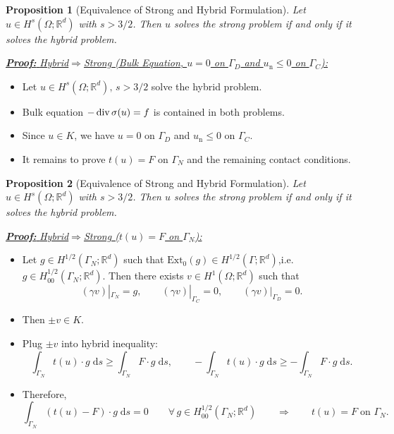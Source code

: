 \documentclass[10pt,aspectratio=169]{beamer}
\newtheorem{proposition}{Proposition}[section]
\def\R{{\mathbb R}}
\def\d{{\mathrm{d}}}
\def\ds{{\d s}}
\newcommand{\diver}{\operatornamewithlimits{div}}
\begin{document}
\begin{frame}
	\begin{proposition}[Equivalence of Strong and Hybrid Formulation]
		Let $u\in H^s(\Omega;\R^d)$ with $s>3/2$. Then $u$ solves the strong problem if and only if it solves the hybrid problem.
	\end{proposition}
	\underline{\textbf{\em Proof:} {\em Hybrid\enspace}$\Longrightarrow${\em\enspace Strong (Bulk Equation, $u = 0$ on $\Gamma_D$ and $u_\mathrm{n}\le 0$ on $\Gamma_C$):}}
	\begin{itemize}
		\item Let $u\in H^s(\Omega;\R^d),\, s>3/2$ solve the hybrid problem.
		\item Bulk equation $-\diver \sigma(u) = f$ is contained in both problems.
		\item Since $u\in K$, we have $u = 0$ on $\Gamma_D$ and $u_\mathrm{n}\le 0$ on $\Gamma_C$.
		\item It remains to prove $t(u) = F$ on $\Gamma_N$ and the remaining contact conditions.
	\end{itemize}
\end{frame}

\begin{frame}
	\begin{proposition}[Equivalence of Strong and Hybrid Formulation]
		Let $u\in H^s(\Omega;\R^d)$ with $s>3/2$. Then $u$ solves the strong problem if and only if it solves the hybrid problem.
	\end{proposition}
	\underline{\textbf{\em Proof:} {\em Hybrid\enspace}$\Longrightarrow${\em\enspace Strong ($t(u) = F$ on $\Gamma_N$):}}
	\begin{itemize}
		\item Let $g\in H^{1/2}(\Gamma_N;\R^d)$ such that $\mathrm{Ext}_0(g)\in H^{1/2}(\Gamma;\R^d)$,i.e.\ $g\in H_{00}^{1/2}(\Gamma_N;\R^d)$. Then there exists $v\in H^1(\Omega;\R^d)$ such that
		      \begin{equation*}
			      (\gamma v)|_{\Gamma_N} = g,\qquad (\gamma v)|_{\Gamma_C} = 0,\qquad (\gamma v)|_{\Gamma_D} = 0.
		      \end{equation*}
		\item Then $\pm v\in K$.
		\item Plug $\pm v$ into hybrid inequality:
		      \begin{equation*}
			      \int_{\Gamma_N}t(u)\cdot g\;\ds\ge \int_{\Gamma_N} F\cdot g\;\ds,\qquad -\int_{\Gamma_N}t(u)\cdot g\;\ds\ge -\int_{\Gamma_N} F\cdot g\;\ds.
		      \end{equation*}
		\item Therefore,
		      \begin{equation*}
			      \int_{\Gamma_N}(t(u)- F)\cdot g\;\ds  = 0\qquad \forall\, g\in H_{00}^{1/2}(\Gamma_N;\R^d)\qquad \Longrightarrow\qquad t(u) = F\;\text{on }\Gamma_N.
		      \end{equation*}
	\end{itemize}
\end{frame}
\end{document}
